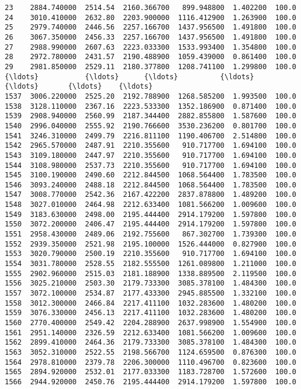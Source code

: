 \documentclass[11pt]{article}
\begin{document}
\begin{Verbatim}[commandchars=\\\{\}]
23    2884.740000  2514.54  2160.366700   899.948800  1.402200  100.0   
24    3010.410000  2632.80  2203.900000  1116.412900  1.263900  100.0   
25    2979.740000  2446.56  2257.166700  1437.956500  1.491800  100.0   
26    3067.350000  2456.33  2257.166700  1437.956500  1.491800  100.0   
27    2988.990000  2607.63  2223.033300  1533.993400  1.354800  100.0   
28    2972.780000  2431.57  2190.488900  1059.439000  0.861400  100.0   
29    2981.850000  2529.11  2180.377800  1208.741100  1.299800  100.0   
{\ldots}           {\ldots}      {\ldots}          {\ldots}          {\ldots}       {\ldots}    {\ldots}   
1537  3006.220000  2525.20  2192.788900  1268.585200  1.993500  100.0   
1538  3128.110000  2367.16  2223.533300  1352.186900  0.871400  100.0   
1539  2908.940000  2560.99  2187.344400  2882.855800  1.587600  100.0   
1540  2996.040000  2555.92  2190.766600  3530.236200  0.801700  100.0   
1541  3246.310000  2499.79  2216.811100  1190.406700  2.514800  100.0   
1542  2965.570000  2487.91  2210.355600   910.717700  1.694100  100.0   
1543  3109.180000  2447.97  2210.355600   910.717700  1.694100  100.0   
1544  3108.980000  2537.73  2210.355600   910.717700  1.694100  100.0   
1545  3100.190000  2490.60  2212.844500  1068.564400  1.783500  100.0   
1546  3093.240000  2488.18  2212.844500  1068.564400  1.783500  100.0   
1547  3008.770000  2542.36  2167.422200  2837.878800  1.489200  100.0   
1548  3027.010000  2464.98  2212.633400  1081.566200  1.009600  100.0   
1549  3183.630000  2498.00  2195.444400  2914.179200  1.597800  100.0   
1550  3072.200000  2406.47  2195.444400  2914.179200  1.597800  100.0   
1551  2958.430000  2489.06  2192.755600   867.302700  1.739300  100.0   
1552  2939.350000  2521.98  2195.100000  1526.444000  0.827900  100.0   
1553  3020.790000  2500.19  2210.355600   910.717700  1.694100  100.0   
1554  3031.780000  2528.55  2182.555500  1261.089800  1.211000  100.0   
1555  2902.960000  2515.03  2181.188900  1338.889500  2.119500  100.0   
1556  3025.210000  2503.30  2179.733300  3085.378100  1.484300  100.0   
1557  3072.100000  2534.87  2177.433300  2945.885500  1.332100  100.0   
1558  3012.300000  2466.84  2217.411100  1032.283600  1.480200  100.0   
1559  3076.330000  2456.13  2217.411100  1032.283600  1.480200  100.0   
1560  2770.400000  2549.42  2204.288900  2637.998900  1.554900  100.0   
1561  2951.140000  2326.59  2212.633400  1081.566200  1.009600  100.0   
1562  2899.410000  2464.36  2179.733300  3085.378100  1.484300  100.0   
1563  3052.310000  2522.55  2198.566700  1124.659500  0.876300  100.0   
1564  2978.810000  2379.78  2206.300000  1110.496700  0.823600  100.0   
1565  2894.920000  2532.01  2177.033300  1183.728700  1.572600  100.0   
1566  2944.920000  2450.76  2195.444400  2914.179200  1.597800  100.0   


\end{Verbatim}
\end{document}
